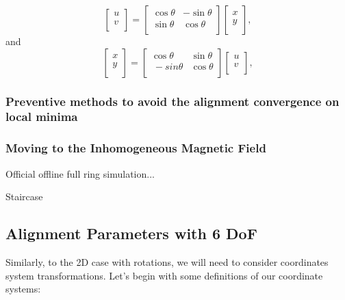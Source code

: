\documentclass[a4paper,11pt]{article}
\begin{document}
\begin{equation}
\begin{bmatrix}u\\v\\\end{bmatrix}=\begin{bmatrix}\cos \theta &-\sin \theta \\\sin \theta &\cos \theta \\\end{bmatrix} \begin{bmatrix}x\\y\\\end{bmatrix},
\end{equation}
and 
\begin{equation}
\begin{bmatrix}x\\y\\\end{bmatrix}=\begin{bmatrix}\cos \theta &\sin \theta \\\ -sin \theta &\cos \theta \\\end{bmatrix} \begin{bmatrix}u\\v\\\end{bmatrix},
\end{equation}



\subsubsection{Preventive methods to avoid the alignment convergence on local minima}


\subsubsection{Moving to the Inhomogeneous Magnetic Field}
Official offline full ring simulation...

Staircase


\subsection{Alignment Parameters with 6 DoF}

Similarly, to the 2D case with rotations, we will need to consider coordinates system transformations. Let's begin with some definitions of our coordinate systems: 
\end{document}
